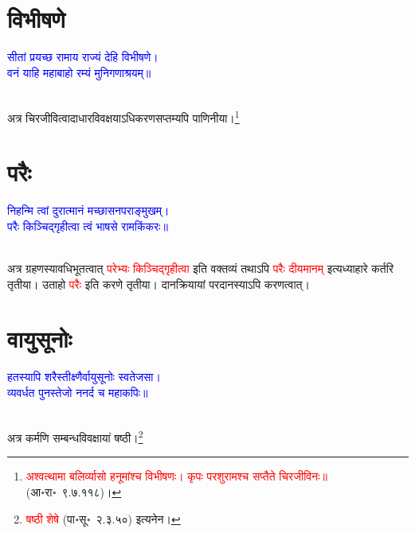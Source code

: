 \section[विभीषणे]{विभीषणे}
\centering\textcolor{blue}{सीतां प्रयच्छ रामाय राज्यं देहि विभीषणे।\nopagebreak\\
वनं याहि महाबाहो रम्यं मुनिगणाश्रयम्॥}\nopagebreak\\
\\
\begin{sloppypar}\justifying\noindent\hspace{10mm} अत्र चिर\-जीवित्वादाधार\-विवक्षयाऽधिकरण\-सप्तम्यपि पाणिनीया।\footnote{\textcolor{red}{अश्वत्थामा बलिर्व्यासो हनूमांश्च विभीषणः। कृपः परशुरामश्च सप्तैते चिरजीविनः॥} (आ॰रा॰~९.७.११८)।}\end{sloppypar}
\section[परैः]{परैः}
\centering\textcolor{blue}{निहन्मि त्वां दुरात्मानं मच्छासनपराङ्मुखम्।\nopagebreak\\
परैः किञ्चिद्गृहीत्वा त्वं भाषसे रामकिंकरः॥}\nopagebreak\\
\\
\begin{sloppypar}\justifying\noindent\hspace{10mm} अत्र ग्रहणस्यावधि\-भूतत्वात् \textcolor{red}{परेभ्यः किञ्चिद्गृहीत्वा} इति वक्तव्यं तथाऽपि \textcolor{red}{परैः दीयमानम्‌} इत्यध्याहारे कर्तरि तृतीया। उताहो \textcolor{red}{परैः} इति करणे तृतीया। दान\-क्रियायां पर\-दानस्याऽपि करणत्वात्।\end{sloppypar}
\section[वायुसूनोः]{वायुसूनोः}
\centering\textcolor{blue}{हतस्यापि शरैस्तीक्ष्णैर्वायुसूनोः स्वतेजसा।\nopagebreak\\
व्यवर्धत पुनस्तेजो ननर्द च महाकपिः॥}\nopagebreak\\
\\
\begin{sloppypar}\justifying\noindent\hspace{10mm} अत्र कर्मणि सम्बन्ध\-विवक्षायां षष्ठी।\footnote{\textcolor{red}{षष्ठी शेषे} (पा॰सू॰~२.३.५०) इत्यनेन।}\end{sloppypar}
